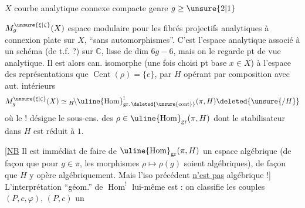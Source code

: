 $X$ courbe analytique connexe compacte genre $g\ge\unsure{2|1}$

$M_g^{\unsure{\xi|\zeta}}(X)$ espace modulaire pour les fibrés projectifs analytiques à connexion plate sur $X$, ``sans automorphismes''. C'est l'espace analytique associé à un schéma (de t.f. ?) sur $\mathbb C$,  lisse de dim $6g-6$, mais on le regarde pt de vue analytique. Il est alors can. isomorphe (une fois choisi pt base $x\in X$) à l'espace des représentations
 que $\operatorname{Cent}(\rho)=\{e\}$, \deleted{\unsure{\#}}  par $H$ opérant par composition avec aut. intérieurs
\[
M_g^{\unsure{\xi|\zeta}}(X)\simeq {}_H\!\backslash\uline{\operatorname{Hom}}^!_{\operatorname{gr.}\deleted{\unsure{\mathrm{cont}}}}(\pi,H)\deleted{\unsure{/H}}
\]
où le $!$ désigne le sous-ens. des $\rho\in\uline{\operatorname{Hom}}_{\operatorname{gr}}(\pi,H)$ dont le stabilisateur dans $H$ est réduit à $1$.

[\uline{NB} Il est immédiat de faire de $\uline{\operatorname{Hom}}_{\operatorname{gr}}(\pi,H)$ un espace algébrique (de façon que pour $g\in\pi$, les morphismes $\rho\longmapsto\rho(g)$ soient algébriques), de façon que $H$ y opère algébriquement. Mais l'iso précédent \uline{n'est pas}  algébrique !]
L'interprétation ``géom.'' de $\operatorname{Hom}^!$ lui-même est : on classifie les couples $(P,c,\varphi)$, $(P,c)$ un
